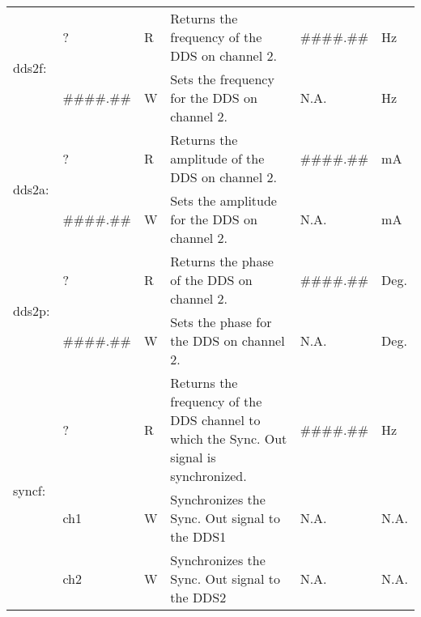\begin{center}
\begin{longtable}{| m{} | m{} | m{} | m{} | m{}| m{} |}
    \multirow{2}{0.1\textwidth}{dds2f:}  & ? & R & Returns the frequency of the DDS on channel 2. &  \#\#\#\#.\#\# & Hz \\
                                        \cline{2-6}
                                        &  \#\#\#\#.\#\#  & W & Sets the frequency for the DDS on channel 2. & N.A. & Hz\\
    \hline
    
    \multirow{2}{0.1\textwidth}{dds2a:}  & ? & R & Returns the amplitude of the DDS on channel 2. &  \#\#\#\#.\#\# & mA \\
                                        \cline{2-6}
                                        &  \#\#\#\#.\#\#  & W & Sets the amplitude for the DDS on channel 2. & N.A. & mA\\
    \hline
    
    \multirow{2}{0.1\textwidth}{dds2p:}  & ? & R & Returns the phase of the DDS on channel 2. &  \#\#\#\#.\#\# & Deg. \\
                                        \cline{2-6}
                                        &  \#\#\#\#.\#\#  & W & Sets the phase for the DDS on channel 2. & N.A. & Deg. \\
    \hline
    
    \multirow{3}{0.1\textwidth}{syncf:}  & ? & R & Returns the frequency of the DDS channel to which the Sync. Out signal is synchronized. &  \#\#\#\#.\#\# & Hz \\
                                        \cline{2-6}
                                        &  ch1  & W & Synchronizes the Sync. Out signal to the DDS1 & N.A. & N.A. \\
                                        \cline{2-6}
                                        &  ch2  & W & Synchronizes the Sync. Out signal to the DDS2 & N.A. & N.A. \\
    \hline
    
    \end{longtable}
\end{center}

\newpage





